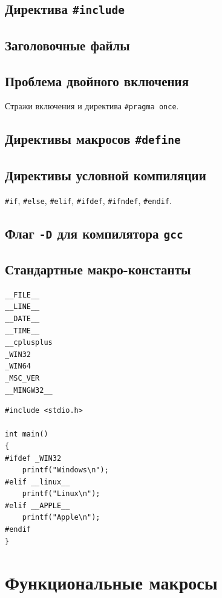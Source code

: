 \documentclass[10pt]{article}
\begin{document}
\subsection*{Директива \texttt{\#include}}

\subsection*{Заголовочные файлы}

\subsection*{Проблема двойного включения}
Стражи включения и директива \texttt{\#pragma once}.

\subsection*{Директивы макросов \texttt{\#define}}

\subsection*{Директивы условной компиляции}
\texttt{\#if}, \texttt{\#else}, \texttt{\#elif}, 
\texttt{\#ifdef}, \texttt{\#ifndef}, \texttt{\#endif}.


\subsection*{Флаг \texttt{-D} для компилятора \texttt{gcc}}

\subsection*{Стандартные макро-константы}
\begin{verbatim}
__FILE__
__LINE__
__DATE__
__TIME__
__cplusplus
_WIN32
_WIN64
_MSC_VER
__MINGW32__
\end{verbatim}

\begin{lstlisting}
#include <stdio.h>

int main()
{
#ifdef _WIN32
    printf("Windows\n");
#elif __linux__
    printf("Linux\n");
#elif __APPLE__
    printf("Apple\n");
#endif
}
\end{lstlisting}


\newpage
\section*{Функциональные макросы}
\end{document}
